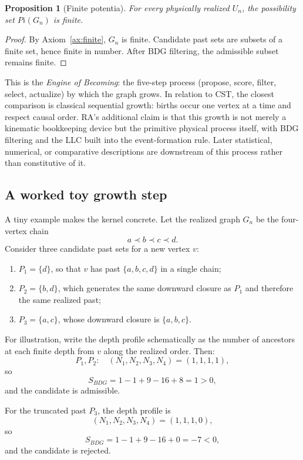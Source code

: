 \documentclass[11pt]{article}
\def\Pi{Pi}%
\def\mathrm#1{#1}%
\newtheorem{proposition}{Proposition}
\newcommand{\Pot}{\Pi}
\begin{document}
\begin{proposition}[Finite potentia]
For every physically realized $U_n$, the possibility set $\Pot(G_n)$ is finite.
\end{proposition}
\begin{proof}
By Axiom~\ref{ax:finite}, $G_n$ is finite. Candidate past sets are subsets of a finite set, hence finite in number. After BDG filtering, the admissible subset remains finite.
\end{proof}

This is the \emph{Engine of Becoming}: the five-step process (propose, score, filter, select, actualize) by which the graph grows. In relation to CST, the closest comparison is classical sequential growth: births occur one vertex at a time and respect causal order. RA's additional claim is that this growth is not merely a kinematic bookkeeping device but the primitive physical process itself, with BDG filtering and the LLC built into the event-formation rule. Later statistical, numerical, or comparative descriptions are downstream of this process rather than constitutive of it.

\subsection{A worked toy growth step}

A tiny example makes the kernel concrete. Let the realized graph $G_n$ be the four-vertex chain
\[
a \prec b \prec c \prec d.
\]
Consider three candidate past sets for a new vertex $v$:

\begin{enumerate}[label=(\alph*)]
\item $P_1=\{d\}$, so that $v$ has past $\{a,b,c,d\}$ in a single chain;
\item $P_2=\{b,d\}$, which generates the same downward closure as $P_1$ and therefore the same realized past;
\item $P_3=\{a,c\}$, whose downward closure is $\{a,b,c\}$.
\end{enumerate}

For illustration, write the depth profile schematically as the number of ancestors at each finite depth from $v$ along the realized order. Then:
\[
P_1,P_2:\quad (N_1,N_2,N_3,N_4)=(1,1,1,1),
\]
so
\[
S_{\mathrm{BDG}}=1-1+9-16+8=1>0,
\]
and the candidate is admissible.

For the truncated past $P_3$, the depth profile is
\[
(N_1,N_2,N_3,N_4)=(1,1,1,0),
\]
so
\[
S_{\mathrm{BDG}}=1-1+9-16+0=-7<0,
\]
and the candidate is rejected.
\end{document}
